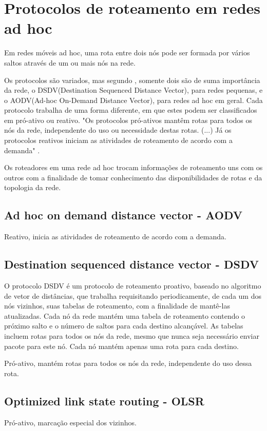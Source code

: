 \section{Protocolos de roteamento em redes ad hoc}
Em redes m\'oveis ad hoc, uma rota entre dois n\'os pode ser formada por v\'arios saltos atrav\'es de um ou mais n\'os na rede. 

Os protocolos s\~ao variados, mas segundo \cite{gorantala}, somente dois s\~ao de suma import\^ancia da rede, o DSDV(Destination Sequenced Distance Vector), para redes pequenas, e o AODV(Ad-hoc On-Demand Distance Vector), para redes ad hoc em geral. Cada protocolo trabalha de uma forma diferente, em que estes podem ser classificados em pr\'o-ativo ou reativo. "Os protocolos pr\'o-ativos mant\^em rotas para todos os n\'os da rede, independente do uso ou necessidade destas rotas. (...) J\'a os protocolos reativos iniciam as atividades de roteamento de acordo com a demanda" \cite{pereira}.

Os roteadores em uma rede ad hoc trocam informa\c{c}\~oes de roteamento uns com os outros com a finalidade de tomar conhecimento das disponibilidades de rotas e da topologia da rede.\cite{pereira}

\subsection{Ad hoc on demand distance vector - AODV}
Reativo, inicia as atividades de roteamento de acordo com a demanda.


\subsection{Destination sequenced distance vector - DSDV}

O protocolo DSDV \'e um protocolo de roteamento proativo, baseado no algoritmo de vetor de dist\^ancias, que trabalha requisitando periodicamente, de cada um dos n\'os vizinhos, suas tabelas de roteamento, com a finalidade de mant\^e-las atualizadas. Cada n\'o da rede mant\'em uma tabela de roteamento contendo o pr\'oximo salto e o n\'umero de saltos para cada destino alcan\c{c}\'avel. As tabelas incluem rotas para todos os n\'os da rede, mesmo que nunca seja necess\'ario enviar pacote para este n\'o. Cada n\'o mant\'em apenas uma rota para cada destino.

Pr\'o-ativo, mant\'em rotas para todos os n\'os da rede, independente do uso dessa rota.


\subsection{Optimized link state routing - OLSR}
Pr\'o-ativo, marca\c{c}\~ao especial dos vizinhos.

